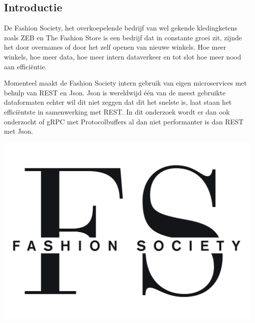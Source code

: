\documentclass[a0,portrait]{a0poster}
\begin{document}
\begin{multicols}{2} %


\color{HoGentAccent1} %

\begin{abstract}

\end{abstract}

\color{HoGentAccent1} 
\section*{Introductie}
\color{black}
\color{black}
De Fashion Society, het overkoepelende bedrijf van wel gekende kledingketens zoals ZEB en The Fashion Store is een bedrijf dat in constante groei zit, zijnde het door overnames of door het zelf openen van nieuwe winkels. Hoe meer winkels, hoe meer data, hoe meer intern dataverkeer en tot slot hoe meer nood aan efficiëntie.

Momenteel maakt de Fashion Society intern gebruik van eigen microservices met behulp van REST en Json. Json is wereldwijd één van de meest gebruikte dataformaten echter wil dit niet zeggen dat dit het snelste is, laat staan het efficiëntste in samenwerking met REST. In dit onderzoek wordt er dan ook onderzocht of gRPC met Protocolbuffers al dan niet performanter is dan REST met Json.

\begin{center}\vspace{1cm}
	\includegraphics[width=1.0\linewidth]{Fashion_society}
\end{center}\vspace{1cm}


\end{multicols}
\end{document}
